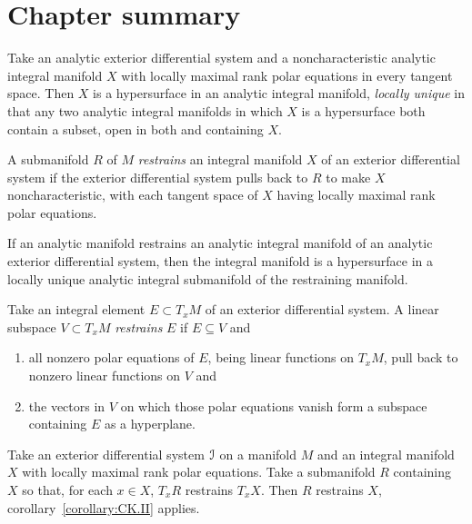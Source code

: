 \section{Chapter summary}
\begin{theorem}%
[Cartan--K\"ahler \Romanbar{1}]%
%
%
\label{theorem:CK.I}
Take an analytic exterior differential system and a noncharacteristic analytic integral manifold \(X\) with locally maximal rank polar equations in every tangent space.
Then \(X\) is a hypersurface in an analytic integral manifold, \emph{locally unique} in that any two analytic integral manifolds in which \(X\) is a hypersurface both contain a subset, open in both and containing \(X\).
\end{theorem}
A submanifold \(R\) of \(M\) \emph{restrains} an integral manifold \(X\) of an exterior differential system if the exterior differential system pulls back to \(R\) to make \(X\) noncharacteristic, with each tangent space of \(X\) having locally maximal rank polar equations.
\begin{corollary}\label{corollary:CK.II}
If an analytic manifold restrains an analytic integral manifold of an analytic exterior differential system, then the integral manifold is a hypersurface in a locally unique analytic integral submanifold of the restraining manifold.
\end{corollary}
Take an integral element \(E\subset T_x M\) of an exterior differential system.
A linear subspace \(V\subset T_x M\) \emph{restrains} \(E\) if \(E\subseteq V\)  and
\begin{enumerate}
\item
all nonzero polar equations of \(E\), being linear functions on \(T_x M\), pull back to nonzero linear functions on \(V\) and
\item
the vectors in \(V\) on which those polar equations vanish form a subspace containing \(E\) as a hyperplane.
\end{enumerate} 
\begin{theorem}%
[Cartan--K\"ahler \Romanbar{2}]%
%
%
\label{theorem:CK.II}
Take an exterior differential system \(\mathcal{I}\) on a manifold \(M\) and an integral manifold \(X\) with locally maximal rank polar equations.
Take a submanifold \(R\) containing \(X\) so that, for each \(x \in X\), \(T_x R\) restrains \(T_x X\).
Then \(R\) restrains \(X\), corollary~\ref{corollary:CK.II} applies.
\end{theorem}
